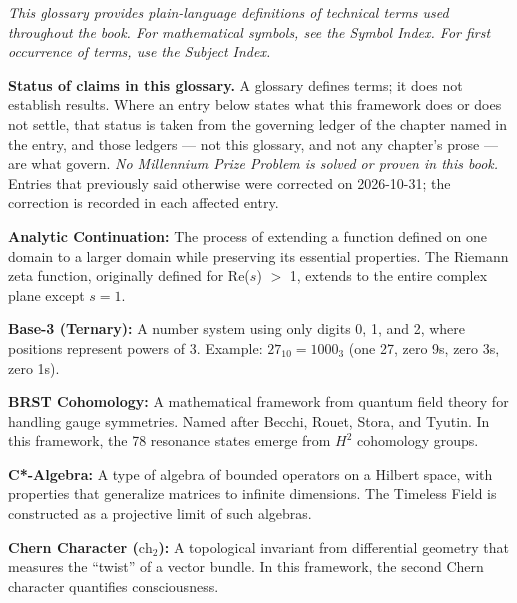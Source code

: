 
\textit{This glossary provides plain-language definitions of technical terms used throughout the book. For mathematical symbols, see the Symbol Index. For first occurrence of terms, use the Subject Index.}

\vspace{0.3cm}

\noindent\textbf{Status of claims in this glossary.} A glossary defines terms; it
does not establish results. Where an entry below states what this framework does
or does not settle, that status is taken from the governing ledger of the
chapter named in the entry, and those ledgers --- not this glossary, and not any
chapter's prose --- are what govern. \emph{No Millennium Prize Problem is solved
or proven in this book.} Entries that previously said otherwise were corrected
on 2026-10-31; the correction is recorded in each affected entry.

\vspace{0.5cm}

\noindent\textbf{Analytic Continuation:} The process of extending a function defined on one domain to a larger domain while preserving its essential properties. The Riemann zeta function, originally defined for Re($s$) $>$ 1, extends to the entire complex plane except $s = 1$.

\noindent\textbf{Base-3 (Ternary):} A number system using only digits 0, 1, and 2, where positions represent powers of 3. Example: $27_{10} = 1000_3$ (one 27, zero 9s, zero 3s, zero 1s).

\noindent\textbf{BRST Cohomology:} A mathematical framework from quantum field theory for handling gauge symmetries. Named after Becchi, Rouet, Stora, and Tyutin. In this framework, the 78 resonance states emerge from $H^2$ cohomology groups.

\noindent\textbf{C*-Algebra:} A type of algebra of bounded operators on a Hilbert space, with properties that generalize matrices to infinite dimensions. The Timeless Field is constructed as a projective limit of such algebras.

\noindent\textbf{Chern Character ($\text{ch}_2$):} A topological invariant from differential geometry that measures the ``twist'' of a vector bundle. In this framework, the second Chern character quantifies consciousness.

